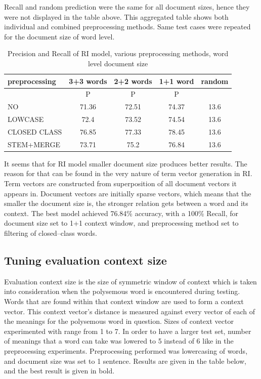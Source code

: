 Recall and random prediction were the same for all document sizes, hence they were not displayed in the table above. This aggregated table shows both individual and combined preprocessing methods. Same test cases were 
repeated for the document size of word level. 

\begin{table}[h!]
\begin{tabular}{ l | c  | c |c | c}
   preprocessing &  3+3 words& 2+2 words& 1+1 word& random\\
\hline
	& P  &  P  &  P  &  \\
\hline\hline
NO &  71.36 & 72.51 & 74.37  & 13.6\\
LOWCASE  &72.4 & 73.52 & 74.54 &13.6   \\
CLOSED CLASS & 76.85 &77.33 &78.45 & 13.6\\
STEM+MERGE   & 73.71  & 75.2 & 76.84 &13.6\\
\end{tabular}
\caption{Precision and Recall of RI model, various preprocessing methods, word level document size}
\end{table}


It seems that for RI model smaller document size produces better results. The reason for that can be found in the very nature of term vector generation in RI. Term vectors are constructed from 
superposition of all document vectors it appears in. Document vectors are initially sparse vectors, which
means that the smaller the document size is, the stronger relation gets between a word and its context.
The best model achieved 76.84\% accuracy, with a 100\% Recall, for document size set to 1+1 context
window, and preprocessing method set to filtering of closed--class words.

\subsection{Tuning evaluation context size}
Evaluation context size is the size of symmetric window of context which is taken into consideration 
when the polysemous word is encountered during testing. Words that are found within that context
window are used to form a context vector. This context vector's distance is measured against every
vector of each  of the meanings for the polysemous word in question. Sizes of context vector 
experimented with range from 1 to 7. In order to have a larger test set, number of meanings that 
a word can take was lowered to 5 instead of 6 like in the preprocessing experiments. Preprocessing
performed was lowercasing of words, and document size was set to 1 sentence. 
Results are given 
in the table below, and the best result is given in bold. 

